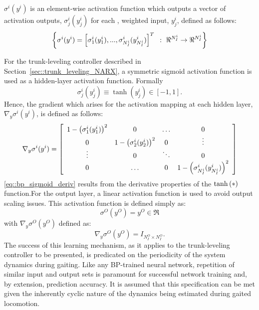 		$\sigma^{i}(y^{i})$ is an element-wise activation function which outputs a vector of activation outputs, $\sigma_{j}^{i}(y_{j}^{i}) $ for each \Jth, weighted input, $y_{j}^{i}$, defined as follows:
			\begin{equation}
				\left\{ \sigma^{i}(y^{i}) = \left[ \sigma_{1}^{i}(y_{1}^{i}),...,\sigma_{N_{I}^{i}}^{i}(y_{N_{I}^{i}}^{i}) \right]^{T} \text{ } : \text{ } \Re^{N_{I}^{i}} \rightarrow \Re^{N_{I}^{i}}\right\}
			\end{equation}


		For the trunk-leveling controller described in Section~\ref{sec::trunk_leveling_NARX}, a symmetric sigmoid activation function is used as a hidden-layer activation function. Formally
			\begin{equation}
				\sigma_{j}^{i}(y_{j}^{i}) \equiv \tanh(y_{j}^{i}) \in [-1,1]. 
				\label{eq::activation_function}
			\end{equation}
		Hence, the gradient which arises for the activation mapping at each hidden layer, $\nabla_{y} \sigma^{i}(y^{i})$, is defined as follows: 
			\newcommand{\acti}[1]{1 - \wrap{\sigma^{i}_{#1}(y^{i}_{#1})}^{2}}
			\begin{equation}
				\nabla_{y} \sigma^{i}(y^{i})  =
				\left[
				\begin{array}{cccc}
					\acti{1} 	&	0		&	\ldots 		&	0 			\\	
					0			&	\acti{2}&	0			& 	\vdots 		\\
					\vdots 		&	0		& 	\ddots 		& 	0			\\
						0			&	\ldots	&	0			& 	\acti{N_{I}^{i}}
				\end{array}
				\right]
				\label{eq::bp_sigmoid_deriv}
			\end{equation} 
		\ref{eq::bp_sigmoid_deriv} results from the derivative properties of the $\tanh\left(*\right)$ function.For the output layer, a linear activation function is used to avoid output scaling issues. This activation function is defined simply as:
			\begin{equation}
				\sigma^{O}(y^{O}) = y^{O} \in \Re
				\label{eq::output_activation_function}
			\end{equation}
		with $\nabla_{y}\sigma^{O}(y^{O})$ defined as:
			\begin{equation}
				\nabla_{y}\sigma^{O}(y^{O}) = I_{N_{I}^{O}\times N_{I}^{O}} . 
				\label{eq::bp_linear_deriv}
			\end{equation}		
		The success of this learning mechanism, as it applies to the trunk-leveling controller to be presented, is predicated on the periodicity of the system dynamics during gaiting. Like any BP-trained neural network, repetition of similar input and output sets is paramount for successful network training and, by extension, prediction accuracy. It is assumed that this specification can be met given the inherently cyclic nature of the dynamics being estimated during gaited locomotion. 







